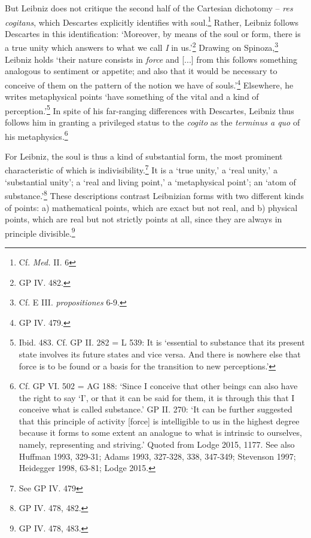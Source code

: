 \documentclass{article}
\begin{document}
But Leibniz does not critique the second half of the Cartesian dichotomy
-- \emph{res cogitans}, which Descartes explicitly identifies with
soul.\footnote{Cf. \emph{Med.} II. 6} Rather, Leibniz follows Descartes
in this identification: `Moreover, by means of the soul or form, there
is a true unity which answers to what we call \emph{I} in us.'\footnote{GP
  IV. 482.} Drawing on Spinoza,\footnote{Cf. E III. \emph{propositiones}
  6-9.} Leibniz holds `their nature consists in \emph{force} and
{[}...{]} from this follows something analogous to sentiment or
appetite; and also that it would be necessary to conceive of them on the
pattern of the notion we have of souls.'\footnote{GP IV. 479.}
Elsewhere, he writes metaphysical points `have something of the vital
and a kind of perception.'\footnote{Ibid. 483. Cf. GP II. 282 = L 539:
  It is `essential to substance that its present state involves its
  future states and vice versa. And there is nowhere else that force is
  to be found or a basis for the transition to new perceptions.'} In
spite of his far-ranging differences with Descartes, Leibniz thus
follows him in granting a privileged status to the \emph{cogito} as the
\emph{terminus a quo} of his metaphysics.\footnote{Cf. GP VI. 502 = AG
  188: `Since I conceive that other beings can also have the right to
  say `I', or that it can be said for them, it is through this that I
  conceive what is called substance.' GP II. 270: `It can be further
  suggested that this principle of activity {[}force{]} is intelligible
  to us in the highest degree because it forms to some extent an
  analogue to what is intrinsic to ourselves, namely, representing and
  striving.' Quoted from Lodge 2015, 1177. See also Huffman 1993,
  329-31; Adams 1993, 327-328, 338, 347-349; Stevenson 1997; Heidegger
  1998, 63-81; Lodge 2015.}

For Leibniz, the soul is thus a kind of substantial form, the most
prominent characteristic of which is indivisibility.\footnote{See GP IV.
  479} It is a `true unity,' a `real unity,' a `substantial unity'; a
`real and living point,' a `metaphysical point'; an `atom of
substance.'\footnote{GP IV. 478, 482.} These descriptions contrast
Leibnizian forms with two different kinds of points: a) mathematical
points, which are exact but not real, and b) physical points, which are
real but not strictly points at all, since they are always in principle
divisible.\footnote{GP IV. 478, 483.}
\end{document}

